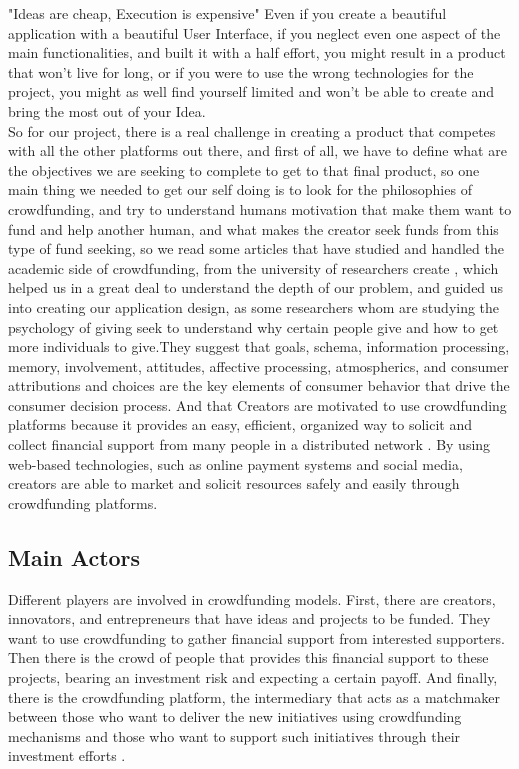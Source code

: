 "Ideas are cheap, Execution is expensive" Even if you create a beautiful application with a beautiful User Interface, if you neglect even one aspect of the main functionalities, and built it with a half effort, you might result in a product that won't live for long, or if you were to use the wrong technologies for the project, you might as well find yourself limited and won't be able to create and bring the most out of your Idea.\\

So for our project, there is a real challenge in creating a product that competes with all the other platforms out there,
and first of all, we have to define what are the objectives we are seeking to complete to get to that final product,
so one main thing we needed to get our self doing is to look for the philosophies of crowdfunding, and try to understand humans motivation that make them want to fund and help another human, and what makes the creator seek funds from this type of fund seeking,
so we read some articles that have studied and handled the academic side of crowdfunding, from the university of  researchers create \cite{inproceedings}, which helped us in a great deal to understand the depth of our problem, and guided us into creating our application design, as some researchers whom are studying the psychology of giving seek to understand why certain people give and how to get more individuals to give.They suggest that goals, schema, information processing, memory, involvement, attitudes, affective processing, atmospherics, and consumer attributions and choices are the key elements of consumer behavior that drive the consumer decision process.
And that Creators are motivated to use crowdfunding platforms because it provides an easy, efficient, organized way to solicit and collect financial support from many people in a distributed network \cite{crowdMotiv}. By using web-based technologies, such as online payment systems and social media, creators are able to market and solicit resources safely and easily through crowdfunding platforms.
\\
\subsection{Main Actors}
Different players are involved in crowdfunding models. First, there are creators, innovators, and entrepreneurs that have ideas and
projects to be funded. They want to use crowdfunding to gather financial support from interested supporters.
Then there is the crowd of people that provides this financial support to these projects, bearing an investment
risk and expecting a certain payoff. And finally, there is the crowdfunding platform, the intermediary that acts
as a matchmaker between those who want to deliver the new initiatives using crowdfunding mechanisms
and those who want to support such initiatives through their investment efforts \cite{crwdfun:transform}.
